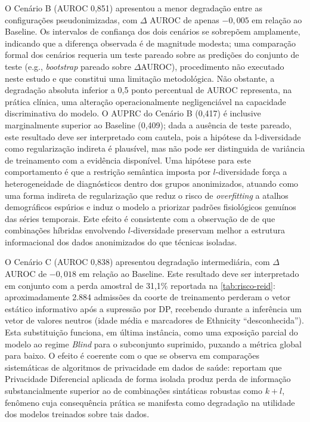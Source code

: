O Cenário B (AUROC 0,851) apresentou a menor degradação entre as configurações pseudonimizadas, com $\Delta$ AUROC de apenas $-0{,}005$ em relação ao Baseline. Os intervalos de confiança dos dois cenários se sobrepõem amplamente, indicando que a diferença observada é de magnitude modesta; uma comparação formal dos cenários requeria um teste pareado sobre as predições do conjunto de teste (e.g., \textit{bootstrap} pareado sobre $\Delta$AUROC), procedimento não executado neste estudo e que constitui uma limitação metodológica. Não obstante, a degradação absoluta inferior a 0,5 ponto percentual de AUROC representa, na prática clínica, uma alteração operacionalmente negligenciável na capacidade discriminativa do modelo. O AUPRC do Cenário B (0,417) é inclusive marginalmente superior ao Baseline (0,409); dada a ausência de teste pareado, este resultado deve ser interpretado com cautela, pois a hipótese da l-diversidade como regularização indireta é plausível, mas não pode ser distinguida de variância de treinamento com a evidência disponível. Uma hipótese para este comportamento é que a restrição semântica imposta por $l$-diversidade força a heterogeneidade de diagnósticos dentro dos grupos anonimizados, atuando como uma forma indireta de regularização que reduz o risco de \textit{overfitting} a atalhos demográficos espúrios e induz o modelo a priorizar padrões fisiológicos genuínos das séries temporais. Este efeito é consistente com a observação de  de que combinações híbridas envolvendo $l$-diversidade preservam melhor a estrutura informacional dos dados anonimizados do que técnicas isoladas.

O Cenário C (AUROC 0,838) apresentou degradação intermediária, com $\Delta$ AUROC de $-0{,}018$ em relação ao Baseline. Este resultado deve ser interpretado em conjunto com a perda amostral de 31,1\% reportada na \autoref{tab:risco-reid}: aproximadamente 2.884 admissões da coorte de treinamento perderam o vetor estático informativo após a supressão por DP, recebendo durante a inferência um vetor de valores neutros (idade média e marcadores de Ethnicity ``desconhecida''). Esta substituição funciona, em última instância, como uma exposição parcial do modelo ao regime \textit{Blind} para o subconjunto suprimido, puxando a métrica global para baixo. O efeito é coerente com o que se observa em comparações sistemáticas de algoritmos de privacidade em dados de saúde:  reportam que Privacidade Diferencial aplicada de forma isolada produz perda de informação substancialmente superior ao de combinações sintáticas robustas como $k+l$, fenômeno cuja consequência prática se manifesta como degradação na utilidade dos modelos treinados sobre tais dados.

